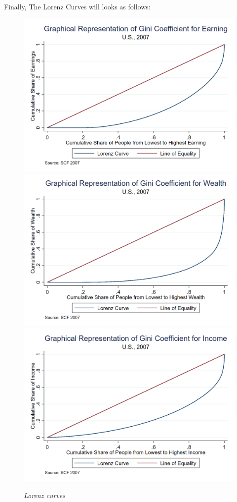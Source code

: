\documentclass[12pt]{article}%
\begin{document}
\begin{enumerate}
	
	Finally, The Lorenz Curves will looks as follows:
	   \begin{figure}[H]
		\begin{center}
			\begin{multicols}{3}
				\includegraphics[width=0.9\linewidth]{build_data/output/Lorenz_earning}
				\columnbreak
				\includegraphics[width=0.9\linewidth]{build_data/output/Lorenz_wealth}
				\columnbreak
				\includegraphics[width=0.9\linewidth]{build_data/output/Lorenz_income}
				\columnbreak
			\end{multicols}
		\end{center}	
		\caption{\small \sl Lorenz curves} 
		\label{fig:Fig1}
	\end{figure}
	
	
	
\end{enumerate}

\strut

\onehalfspacing
\end{document}
